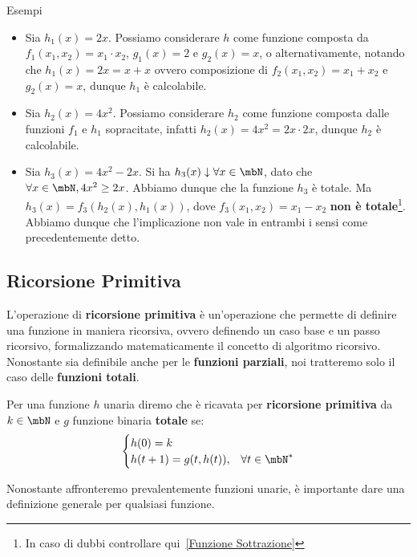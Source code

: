 \begin{generalbox}[colframe=azure-gradient-3!90!black]{Esempi}
  \begin{itemize}
    \item Sia \(h_1(x)=2x\). Possiamo considerare \(h\) come funzione composta da \(f_1(x_1, x_2)=x_1 \cdot x_2\), \(g_1(x)=2\) e \(g_2(x)=x\), o alternativamente, notando che \(h_1(x)=2x=x+x\) ovvero composizione di \(f_2(x_1,x_2)=x_1+x_2\) e \(g_2(x)=x\), dunque \(h_1\) è calcolabile.
    \item Sia \(h_2(x)=4x^2\). Possiamo considerare \(h_2\) come funzione composta dalle funzioni \(f_1\) e \(h_1\) sopracitate, infatti \(h_2(x)=4x^2=2x\cdot 2x\), dunque \(h_2\) è calcolabile.
    \item Sia \(h_3(x)=4x^2-2x\). Si ha \(h_3(x)\downarrow \forall x \in \mbN\), dato che \(\forall x \in \mbN, 4x^2 \geq 2x\). Abbiamo dunque che la funzione \(h_3\) è totale. Ma \(h_3(x)=f_3(h_2(x),h_1(x))\), dove \(f_3(x_1,x_2)=x_1-x_2\) \textbf{non è totale}\footnote{In caso di dubbi controllare qui~\ref{Funzione Sottrazione}}. Abbiamo dunque che l'implicazione non vale in entrambi i sensi come precedentemente detto.
  \end{itemize}
\end{generalbox}

\subsection{Ricorsione Primitiva}

L'operazione di \textbf{ricorsione primitiva} è un'operazione che permette di definire una funzione in maniera ricorsiva, ovvero definendo un caso base e un passo ricorsivo, formalizzando matematicamente il concetto di algoritmo ricorsivo.
Nonostante sia definibile anche per le \textbf{funzioni parziali}, noi tratteremo solo il caso delle \textbf{funzioni totali}.

Per una funzione \(h\) unaria diremo che è ricavata per \textbf{ricorsione primitiva} da \(k\in\mbN\) e \(g\) funzione binaria \textbf{totale} se:
\begin{equation}
  \begin{cases}
    h(0)=k\\
    h(t+1)=g(t,h(t)), & \forall t\in\mbN^*
  \end{cases}
\end{equation}

Nonostante affronteremo prevalentemente funzioni unarie, è importante dare una definizione generale per qualsiasi funzione.

